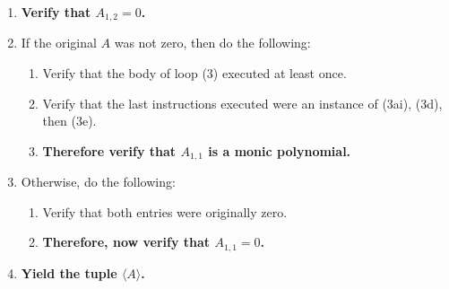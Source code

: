 \documentclass[twocolumn]{article}
\begin{document}
\begin{enumerate}
\begin{enumerate}
				\end{enumerate}
				\item \textbf{Verify that $A_{1,2}=0$.}
				\item If the original $A$ was not zero, then do the following:
				\begin{enumerate}
					\item Verify that the body of loop (3) executed at least once.
					\item Verify that the last instructions executed were an instance of (3ai), (3d), then (3e).
					\item \textbf{Therefore verify that $A_{1,1}$ is a monic polynomial.}
				\end{enumerate}
				\item Otherwise, do the following:
				\begin{enumerate}
					\item Verify that both entries were originally zero.
					\item \textbf{Therefore, now verify that $A_{1,1}=0$.}
				\end{enumerate}
				\item \textbf{Yield the tuple $\langle A\rangle$.}
			\end{enumerate}
\end{document}
